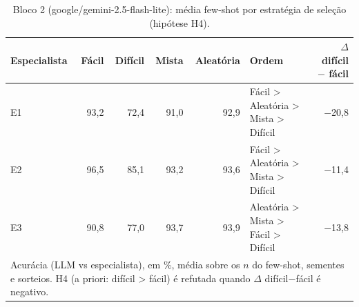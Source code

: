 \begin{table}[htbp]
\centering
\small
\caption{Bloco 2 (google/gemini-2.5-flash-lite): média few-shot por estratégia de seleção (hipótese H4).}
\label{tab:bloco2_E_H4_media_fewshot_por_estrategia_flashlite}
\begin{tabular}{lrrrrlr}
\toprule
Especialista & Fácil & Difícil & Mista & Aleatória & Ordem & $\Delta$ difícil $-$ fácil \\
\midrule
E1 & 93,2 & 72,4 & 91,0 & 92,9 & Fácil > Aleatória > Mista > Difícil & $-$20,8 \\
E2 & 96,5 & 85,1 & 93,2 & 93,6 & Fácil > Aleatória > Mista > Difícil & $-$11,4 \\
E3 & 90,8 & 77,0 & 93,7 & 93,9 & Aleatória > Mista > Fácil > Difícil & $-$13,8 \\
\bottomrule
\multicolumn{7}{p{0.95\linewidth}}{\footnotesize Acurácia (LLM vs especialista), em \%, média sobre os $n$ do few-shot, sementes e sorteios. H4 (a priori: difícil > fácil) é refutada quando $\Delta$ difícil$-$fácil é negativo.} \\
\end{tabular}
\end{table}
